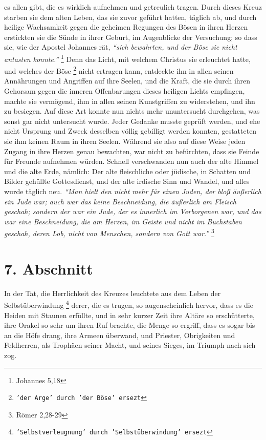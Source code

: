 es allen gibt, die es wirklich aufnehmen und getreulich tragen. Durch dieses
Kreuz starben sie dem alten Leben, das sie zuvor geführt hatten, täglich ab, und
durch heilige Wachsamkeit gegen die geheimen Regungen des Bösen in ihren Herzen
erstickten sie die Sünde in ihrer Geburt, im Augenblicke der Versuchung; so dass
sie, wie der Apostel Johannes rät,
\textit{"`sich bewahrten, und der Böse sie nicht antasten konnte."'}
\footnote{Johannes 5,18}
Denn das Licht, mit welchem Christus sie erleuchtet hatte, und welches der Böse
\footnote{\texttt{'der Arge' durch 'der Böse' ersezt}}
nicht ertragen kann, entdeckte ihn in allen seinen Annährungen und Angriffen auf
ihre Seelen, und die Kraft, die sie durch ihren Gehorsam gegen die inneren
Offenbarungen dieses heiligen Lichts empfingen, machte sie vermögend, ihm in
allen seinen Kunstgriffen zu widerstehen, und ihn zu besiegen. Auf diese Art
konnte nun nichts mehr ununtersucht durchgehen, was sonst gar nicht untersucht
wurde. Jeder Gedanke musste geprüft werden, und ehe nicht Ursprung und Zweck
desselben völlig gebilligt werden konnten, gestatteten sie ihm keinen Raum in
ihren Seelen. Während sie also auf diese Weise jeden Zugang in ihre Herzen genau
bewachten, war nicht zu befürchten, dass sie Feinde für Freunde aufnehmen würden.
Schnell verschwanden nun auch der alte Himmel und die alte Erde, nämlich: Der
alte fleischliche oder jüdische, in Schatten und Bilder gehüllte Gottesdienst,
und der alte irdische Sinn und Wandel, und alles wurde täglich neu.
\textit{"`Man hielt
den nicht mehr für einen Juden, der bloß äußerlich ein Jude war; auch war das
keine Beschneidung, die äußerlich am Fleisch geschah; sondern der war ein Jude,
der es innerlich im Verborgenen war, und das war eine Beschneidung, die am
Herzen, im Geiste und nicht im Buchstaben geschah, deren Lob, nicht von
Menschen, sondern von Gott war."'}
\footnote{Römer 2,28-29}

\section{7. Abschnitt}  \label{kap2_ab7}

In der Tat, die Herrlichkeit des Kreuzes leuchtete aus dem Leben der
Selbstüberwindung
\footnote{\texttt{'Selbstverleugnung' durch 'Selbstüberwindung' ersezt}}
derer, die es trugen, so augenscheinlich hervor, dass es die
Heiden mit Staunen erfüllte, und in sehr kurzer Zeit ihre Altäre so
erschütterte, ihre Orakel so sehr um ihren Ruf brachte, die Menge so ergriff,
dass es sogar bis an die Höfe drang, ihre Armeen überwand, und Priester,
Obrigkeiten und Feldherren, als Trophäen seiner Macht, und seines Sieges, im
Triumph nach sich zog.

